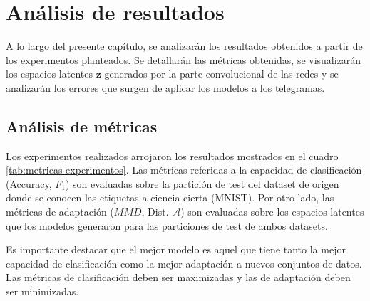 \chapter{Análisis de resultados}

\label{Chapter4}

A lo largo del presente capítulo, se analizarán los resultados obtenidos a partir de los experimentos planteados. Se
detallarán las métricas obtenidas, se visualizarán los espacios latentes $\mathbf{z}$ generados por la parte
convolucional de las redes y se analizarán los errores que surgen de aplicar los modelos a los telegramas.

\section{Análisis de métricas}

Los experimentos realizados arrojaron los resultados mostrados en el cuadro \ref{tab:metricas-experimentos}. Las
métricas referidas a la capacidad de clasificación (Accuracy, $F_1$) son evaluadas sobre la partición de test del
dataset de origen donde se conocen las etiquetas a ciencia cierta (MNIST). Por otro lado, las métricas de adaptación
($MMD$, Dist. $\mathcal{A}$) son evaluadas sobre los espacios latentes que los modelos generaron para las particiones
de test de ambos datasets.

Es importante destacar que el mejor modelo es aquel que tiene tanto la mejor capacidad de clasificación como la mejor
adaptación a nuevos conjuntos de datos. Las métricas de clasificación deben ser maximizadas y las de adaptación deben
ser minimizadas.

